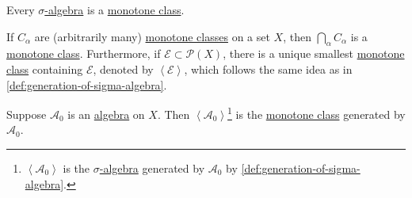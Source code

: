 \begin{eg}
	Every \hyperref[def:sigma-algebra]{\(\sigma\)-algebra} is a \hyperref[def:monotone-class]{monotone class}.
\end{eg}

\begin{eg}
	If \(C_\alpha \) are (arbitrarily many) \hyperref[def:monotone-class]{monotone classes} on a set \(X\), then \(\bigcap_{\alpha}C_\alpha \) is a \hyperref[def:monotone-class]{monotone class}. Furthermore, if \(\mathcal{E} \subset \mathcal{P} (X)\), there is a unique smallest \hyperref[def:monotone-class]{monotone class} containing \(\mathcal{E}\), denoted by \(\left< \mathcal{E}  \right> \), which follows the same idea as in \autoref{def:generation-of-sigma-algebra}.
\end{eg}

\begin{theorem}\label{thm:monotone-class-lemma}
	Suppose \(\mathcal{A} _0\) is an \hyperref[def:algebra]{algebra} on \(X\). Then \(\left< \mathcal{A} _0 \right>\)\footnote{\(\left< \mathcal{A} _0 \right> \) is
		the \hyperref[def:sigma-algebra]{\(\sigma\)-algebra} generated by \(\mathcal{A} _0\) by \autoref{def:generation-of-sigma-algebra}.} is the \hyperref[def:monotone-class]{monotone class} generated by \(\mathcal{A} _0\).
\end{theorem}

